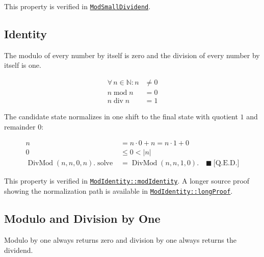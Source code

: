 This property is verified in
\href{https://github.com/thiagomata/prime-numbers/blob/modulo-article-v1.0.0/src/main/scala/v1/chapter2/div/properties/ModSmallDividend.scala}{\texttt{ModSmallDividend}}.

\subsection{Identity}
\label{sec:identity}

The modulo of every number by itself is zero and the division of every number
by itself is one.

\begin{equation*}
\begin{aligned}
\forall\, n \in \mathbb{N} : n &\neq 0 \\
n \operatorname{mod} n &= 0 \\
n \operatorname{div} n &= 1
\end{aligned}
\end{equation*}

The candidate state normalizes in one shift to the final state with quotient
$1$ and remainder $0$:

\begin{equation*}
\begin{aligned}
n &= n\cdot 0+n = n\cdot 1+0 \\
0 &\leq 0 < \lvert n\rvert \\
\operatorname{DivMod}(n,n,0,n).\operatorname{solve}
  &= \operatorname{DivMod}(n,n,1,0). \quad \blacksquare\ \text{[Q.E.D.]}
\end{aligned}
\end{equation*}

This property is verified in
\href{https://github.com/thiagomata/prime-numbers/blob/modulo-article-v1.0.0/src/main/scala/v1/chapter2/div/properties/ModIdentity.scala}{\texttt{ModIdentity::modIdentity}}.
A longer source proof showing the normalization path is available in
\href{https://github.com/thiagomata/prime-numbers/blob/modulo-article-v1.0.0/src/main/scala/v1/chapter2/div/properties/ModIdentity.scala#longProof}{\texttt{ModIdentity::longProof}}.

\subsection{Modulo and Division by One}
\label{sec:mod-one}

Modulo by one always returns zero and division by one always returns the
dividend.

